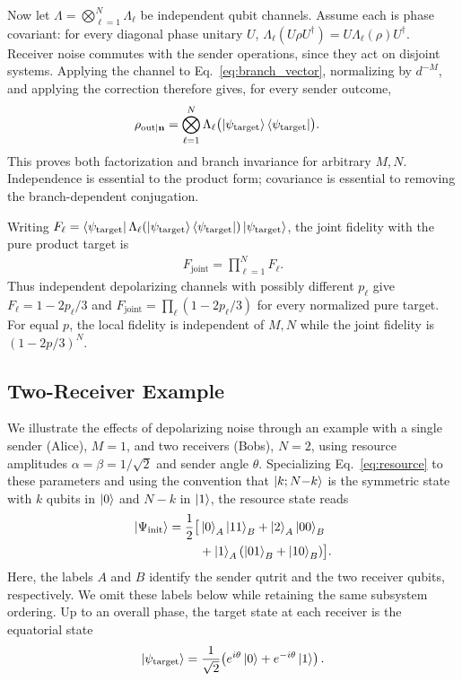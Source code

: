 \documentclass[aps,physrev,10pt,twocolumn,superscriptaddress,floatfix]{revtex4-2}
\begin{document}
Now let $\Lambda=\bigotimes_{\ell=1}^N\Lambda_\ell$ be independent qubit channels. Assume each is phase covariant: for every diagonal phase unitary $U$, $\Lambda_\ell(U\rho U^\dagger)=U\Lambda_\ell(\rho)U^\dagger$. Receiver noise commutes with the sender operations, since they act on disjoint systems. Applying the channel to Eq.~\eqref{eq:branch_vector}, normalizing by $d^{-M}$, and applying the correction therefore gives, for every sender outcome,
\begin{align}
 \rho_{\mathrm{out}\mid\mathbf n}
 &=\bigotimes_{\ell=1}^N\Lambda_\ell
 \bigl(\ket{\psi_{\mathrm{target}}}\bra{\psi_{\mathrm{target}}}\bigr).
 \label{eq:factorization}
\end{align}
This proves both factorization and branch invariance for arbitrary $M,N$. Independence is essential to the product form; covariance is essential to removing the branch-dependent conjugation.

Writing $F_\ell=\bra{\psi_{\mathrm{target}}}\Lambda_\ell(\ket{\psi_{\mathrm{target}}}\bra{\psi_{\mathrm{target}}})\ket{\psi_{\mathrm{target}}}$, the joint fidelity with the pure product target is
\begin{align}
 F_{\mathrm{joint}}=\prod_{\ell=1}^N F_\ell.
 \label{eq:global_product}
\end{align}
Thus independent depolarizing channels with possibly different $p_\ell$ give $F_\ell=1-2p_\ell/3$ and $F_{\mathrm{joint}}=\prod_\ell(1-2p_\ell/3)$ for every normalized pure target. For equal $p$, the local fidelity is independent of $M,N$ while the joint fidelity is $(1-2p/3)^N$.

\subsection{Two-Receiver Example}
We illustrate the effects of depolarizing noise through an example with a single sender (Alice), $M=1$, and two receivers (Bobs), $N=2$, using resource amplitudes $\alpha=\beta=1/\sqrt{2}$ and sender angle $\theta$. Specializing Eq.~\eqref{eq:resource} to these parameters and using the convention that $\ket{k;N{-}k}$ is the symmetric state with $k$ qubits in $\ket{0}$ and $N{-}k$ in $\ket{1}$, the resource state reads
\begin{align}
    \ket{\Psi_{\text{init}}} = \frac{1}{2}\big[&\ket{0}_A\ket{11}_{B} + \ket{2}_A\ket{00}_{B}\nonumber\\
    &+\ket{1}_A(\ket{01}_{B} + \ket{10}_{B})\big].
\end{align}
Here, the labels $A$ and $B$ identify the sender qutrit and the two receiver qubits, respectively. We omit these labels below while retaining the same subsystem ordering. Up to an overall phase, the target state at each receiver is the equatorial state
\begin{align}
    \ket{\psi_{\mathrm{target}}} = \frac{1}{\sqrt{2}}\!\left(e^{i\theta}\ket{0} + e^{-i\theta}\ket{1}\right).
\end{align}
\end{document}
